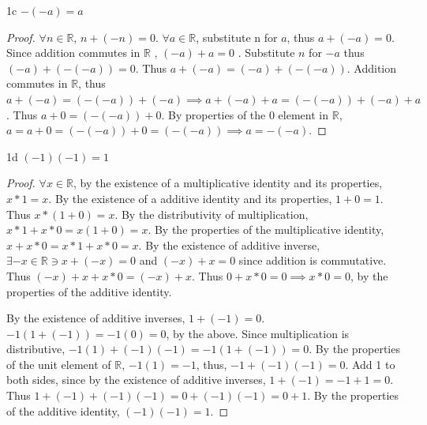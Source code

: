 \documentclass{article}
\newcommand{\R}{\mathbb{R}}
\begin{document}
\begin{claim}{1c}\label{Claim 1c.}
    $-(-a) = a$ 
\end{claim}
\begin{proof}
    $\forall n \in \R$, $n + (-n) = 0$. $\forall a \in \R$, substitute n for $a$, thus $a + (-a) = 0$. Since addition commutes in $\R$ , $(-a) + a = 0$ . Substitute $n$ for $-a$ thus $(-a) + (-(-a)) = 0$. Thus $a + (-a)= (-a) +(-(-a))$. Addition commutes in $\R$, thus $a + (-a) = (-(-a)) +(-a) \implies a + (-a) + a = (-(-a)) + (-a) + a$. Thus $a + 0 = (-(-a)) + 0$. By properties of the 0 element in $\R$, $a = a + 0 = (-(-a)) + 0 = (-(-a)) \implies a= -(-a)$.                   
\end{proof}
\begin{claim}{1d}\label{Claim 1d.}
    $(-1)(-1) = 1$ 
\end{claim}
\begin{proof}
    $\forall x \in \R$, by the existence of a multiplicative identity and its properties, $x * 1 = x$. By the existence of a additive identity and its properties, $1 + 0 = 1$. Thus $x * (1 + 0) = x$. By the distributivity of multiplication, $x*1 + x*0 = x(1 + 0) = x$. By the properties of the multiplicative identity, $x + x*0 =x*1 + x*0 = x$. By the existence of additive inverse, $\exists -x \in \R \ni x + (-x) = 0$ and $(-x) + x = 0$ since addition is commutative. Thus $(-x) + x + x*0 = (-x) + x$. Thus $0 + x*0 = 0 \implies x * 0 = 0$, by the properties of the additive identity.    

    By the existence of additive inverses, $1 + (-1) = 0$. $-1 (1 + (- 1)) = -1(0) = 0$, by the above. Since multiplication is distributive, $-1(1) + (-1)(-1)= -1(1 + (-1)) = 0$. By the properties of the unit element of $\R$, $-1(1) = -1$, thus, $-1 + (-1)(-1) = 0$. Add 1 to both sides, since by the existence of additive inverses, $1 + (-1) = -1 + 1 = 0$. Thus $1 + (-1) + (-1)(-1) = 0 + (-1)(-1)= 0 + 1$. By the properties of the additive identity, $(-1)(-1) = 1$.   
\end{proof}
\end{document}
